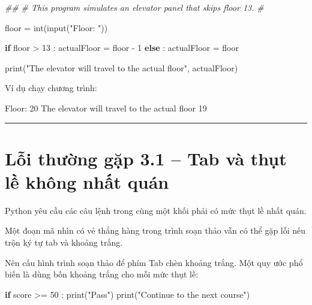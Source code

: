 \documentclass[
  11pt,
  a4paper,
]{article}
\newenvironment{Shaded}{}{}
\newcommand{\BuiltInTok}[1]{\textcolor[rgb]{0.00,0.50,0.00}{#1}}
\newcommand{\CommentTok}[1]{\textcolor[rgb]{0.38,0.63,0.69}{\textit{#1}}}
\newcommand{\ControlFlowTok}[1]{\textcolor[rgb]{0.00,0.44,0.13}{\textbf{#1}}}
\newcommand{\DecValTok}[1]{\textcolor[rgb]{0.25,0.63,0.44}{#1}}
\newcommand{\NormalTok}[1]{#1}
\newcommand{\OperatorTok}[1]{\textcolor[rgb]{0.40,0.40,0.40}{#1}}
\newcommand{\StringTok}[1]{\textcolor[rgb]{0.25,0.44,0.63}{#1}}
\begin{document}
\begin{Shaded}
\begin{Highlighting}[]
\CommentTok{\#\#}
\CommentTok{\# This program simulates an elevator panel that skips floor 13.}
\CommentTok{\#}

\NormalTok{floor }\OperatorTok{=} \BuiltInTok{int}\NormalTok{(}\BuiltInTok{input}\NormalTok{(}\StringTok{"Floor: "}\NormalTok{))}

\ControlFlowTok{if}\NormalTok{ floor }\OperatorTok{\textgreater{}} \DecValTok{13}\NormalTok{ :}
\NormalTok{    actualFloor }\OperatorTok{=}\NormalTok{ floor }\OperatorTok{{-}} \DecValTok{1}
\ControlFlowTok{else}\NormalTok{ :}
\NormalTok{    actualFloor }\OperatorTok{=}\NormalTok{ floor}

\BuiltInTok{print}\NormalTok{(}\StringTok{"The elevator will travel to the actual floor"}\NormalTok{, actualFloor)}
\end{Highlighting}
\end{Shaded}

Ví dụ chạy chương trình:

\begin{Shaded}
\begin{Highlighting}[]
\NormalTok{Floor: 20}
\NormalTok{The elevator will travel to the actual floor 19}
\end{Highlighting}
\end{Shaded}

\begin{center}\rule{0.5\linewidth}{0.5pt}\end{center}

\section{Lỗi thường gặp 3.1 -- Tab và thụt lề không nhất
quán}\label{lux1ed7i-thux1b0ux1eddng-gux1eb7p-3.1-tab-vuxe0-thux1ee5t-lux1ec1-khuxf4ng-nhux1ea5t-quuxe1n}

Python yêu cầu các câu lệnh trong cùng một khối phải có mức thụt lề nhất
quán.

Một đoạn mã nhìn có vẻ thẳng hàng trong trình soạn thảo vẫn có thể gặp
lỗi nếu trộn ký tự tab và khoảng trắng.

Nên cấu hình trình soạn thảo để phím Tab chèn khoảng trắng. Một quy ước
phổ biến là dùng bốn khoảng trắng cho mỗi mức thụt lề:

\begin{Shaded}
\begin{Highlighting}[]
\ControlFlowTok{if}\NormalTok{ score }\OperatorTok{\textgreater{}=} \DecValTok{50}\NormalTok{ :}
    \BuiltInTok{print}\NormalTok{(}\StringTok{"Pass"}\NormalTok{)}
    \BuiltInTok{print}\NormalTok{(}\StringTok{"Continue to the next course"}\NormalTok{)}
\end{Highlighting}
\end{Shaded}
\end{document}
